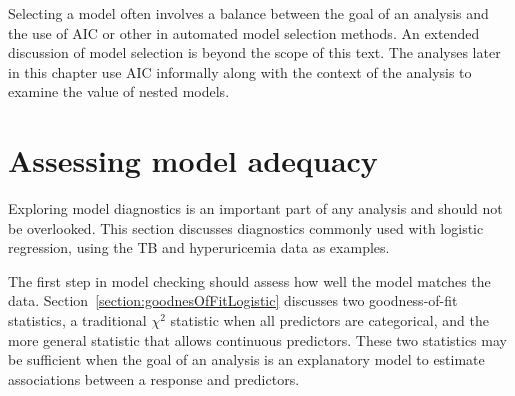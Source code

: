 Selecting a model often involves a balance between the goal of an analysis and the use of AIC or other in automated model selection methods. An extended discussion of model selection is beyond the scope of this text. The analyses later in this chapter use AIC informally along with the context of the analysis to examine the value of nested models.  

\section{Assessing model adequacy}
\label{assessingModelFitMultipleLogisticRegression}

Exploring model diagnostics is an important part of any analysis and should not be overlooked.  This section discusses diagnostics commonly used with logistic regression, using the TB and hyperuricemia data as examples.

The first step in model checking should assess how well the model matches the data.  Section~\ref{section:goodnesOfFitLogistic} discusses two goodness-of-fit statistics, a traditional $\chi^2$ statistic when all predictors are categorical, and the more general  statistic that allows continuous predictors.  These two statistics may be sufficient when the goal of an analysis is an explanatory model to estimate associations between a response and predictors.

